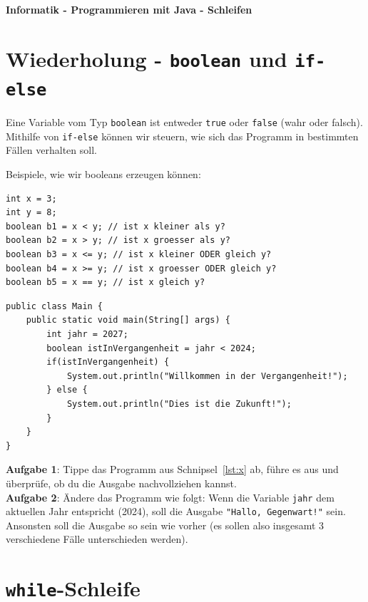 \documentclass[ngerman,11pt]{article}
\begin{document}
{\huge \textbf{Informatik - Programmieren mit Java - Schleifen}}

    \setlength{\parindent}{0}


    \section{Wiederholung - \lstinline{boolean} und \lstinline{if-else}}

    Eine Variable vom Typ \lstinline{boolean} ist entweder \lstinline{true} oder \lstinline{false} (wahr oder falsch).
    Mithilfe von \lstinline{if-else} können wir steuern, wie sich das Programm in bestimmten
    Fällen verhalten soll.

    Beispiele, wie wir booleans erzeugen können:

    \begin{lstlisting}[caption=\lstinline{Vergleiche}]
int x = 3;
int y = 8;
boolean b1 = x < y; // ist x kleiner als y?
boolean b2 = x > y; // ist x groesser als y?
boolean b3 = x <= y; // ist x kleiner ODER gleich y?
boolean b4 = x >= y; // ist x groesser ODER gleich y?
boolean b5 = x == y; // ist x gleich y?
    \end{lstlisting}

    \begin{lstlisting}[caption=\lstinline{if-else},label={lst:x}]
public class Main {
    public static void main(String[] args) {
        int jahr = 2027;
        boolean istInVergangenheit = jahr < 2024;
        if(istInVergangenheit) {
            System.out.println("Willkommen in der Vergangenheit!");
        } else {
            System.out.println("Dies ist die Zukunft!");
        }
    }
}
    \end{lstlisting}

    \textbf{Aufgabe 1}: Tippe das Programm aus Schnipsel~\ref{lst:x} ab, führe es aus und überprüfe, ob du die Ausgabe nachvollziehen kannst. \\

    \textbf{Aufgabe 2}: Ändere das Programm wie folgt: Wenn die Variable \lstinline{jahr} dem aktuellen Jahr entspricht (2024),
    soll die Ausgabe \lstinline{"Hallo, Gegenwart!"} sein.
    Ansonsten soll die Ausgabe so sein wie vorher
    (es sollen also insgesamt 3 verschiedene Fälle unterschieden werden).

    \section{\lstinline{while}-Schleife}
\end{document}
